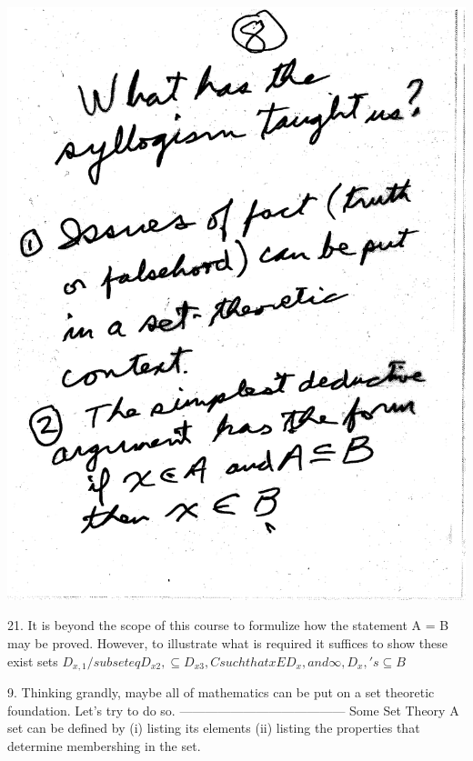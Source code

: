 \documentclass[10pt,a4paper]{article}
\begin{document}
\includegraphics[scale=.5]{Pages/ST_8}



\newpage

21. It is beyond the scope of this course to formulize how the statement A = B may be proved. However, to illustrate what is required it suffices to show these exist sets
$D_{x{,{1}}} /subseteq D_{x2}, \subseteq D_{x3}, C such that x ED_{x}, and \infty, D_{x}, 's \subseteq B$

\vspace{.20 in}

\newpage

9. Thinking grandly, maybe all of mathematics can be put on a set theoretic foundation. Let's try to do so.
---------------------------------------
Some Set Theory
A set can be defined by (i) listing its elements (ii) listing the properties that determine membershing in the set.

\vspace{.20 in}
\end{document}
